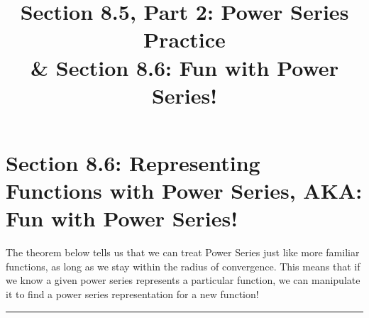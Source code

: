 \documentclass[10pt]{article}
\begin{document}
\newcommand{\an}{\lbrace a_n \rbrace}
\newcommand{\Sum}{\sum_{n=1}^\infty }
\newcommand{\Sumzero}{\sum_{n=0}^\infty }

\everymath{\displaystyle}

\renewcommand{\myTitle}{	MATH 1336: Calculus III}

\renewcommand{\mySubTitle}{Section 8.5, Part 2: Power Series Practice\\ \& Section 8.6: Fun with Power Series! }


\title{\mySubTitle}\date{}
\maketitle



\hspace*{-.8in}%

\setlength{\columnseprule}{.4pt}
\setlength{\columnsep}{3em}


\section*{Section 8.6: Representing Functions with Power Series, AKA: Fun with Power Series!}
The theorem below tells us that we can treat Power Series just like more familiar functions, as long as we stay within the radius of convergence.
This means that if we know a given power series represents a particular function, we can manipulate it to find a power series representation for a new function!\\



\hrule
\vspace*{.2in}

\end{document}
